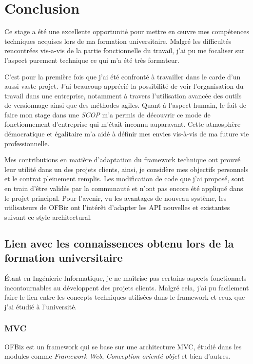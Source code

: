 \chapter{Conclusion}
Ce stage a été une excellente opportunité pour mettre en œuvre mes compétences techniques acquises lors de ma formation universitaire. Malgré les difficultés rencontrées vis-a-vis de la partie fonctionnelle du travail, j'ai pu me focaliser sur l'aspect purement technique ce qui m'a été très formateur. 

C'est pour la première fois que j'ai été confronté à travailler dans le carde d'un aussi vaste projet. J'ai beaucoup apprécié la possibilité de voir l'organisation du travail dans une entreprise, notamment à travers l'utilisation avancée des outils de versionnage ainsi que des méthodes agiles. Quant à l'aspect humain, le fait de faire mon stage dans une \emph{SCOP} m'a permis de découvrir ce mode de fonctionnement d'entreprise qui m'était inconnu auparavant. Cette atmosphère démocratique et égalitaire m'a aidé à définir mes envies vis-à-vis de ma future vie professionnelle.

Mes contributions en matière d'adaptation du framework technique ont prouvé leur utilité dans un des projets clients, ainsi, je considère mes objectifs personnels et le contrat pleinement remplis. Les modification de code que j'ai proposé, sont en train d'être validés par la communauté et n'ont pas encore été appliqué dans le projet principal.
Pour l'avenir, vu les avantages de nouveau système, les utilisateurs de OFBiz ont l'intérêt d'adapter les API nouvelles et existantes suivant ce style architectural.



\section{Lien avec les connaissences obtenu lors de la formation universitaire}
Étant en Ingénierie Informatique, je ne maîtrise pas certains aspects fonctionnels incontournables au développent des projets clients. Malgré cela, j'ai pu facilement faire le lien entre les concepts techniques utilisées dans le framework et ceux que j'ai étudié à l'université. 
\subsection{MVC}
OFBiz est un framework qui se base sur une architecture MVC, étudié dans les modules comme \emph{Framework Web}, \emph{Conception orienté objet} et bien d'autres. 
